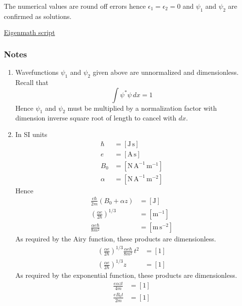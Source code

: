 The numerical values are round off errors
hence $\epsilon_1=\epsilon_2=0$ and $\psi_1$ and $\psi_2$ are confirmed as solutions.

\bigskip
\href{https://georgeweigt.github.io/examples/stern-gerlach-2-demo.html}{Eigenmath script}

\subsubsection*{Notes}

\begin{enumerate}

\item
Wavefunctions $\psi_1$ and $\psi_2$ given above are unnormalized and dimensionless.
Recall that
\begin{equation*}
\int\psi^*\psi\,dx=1
\end{equation*}
%
Hence $\psi_1$ and $\psi_2$ must be multiplied by a normalization factor with
dimension inverse square root of length to cancel with $dx$.

\item
In SI units
\begin{align*}
\hbar&=[\text{J}\,\text{s}]
\\
e&=[\text{A}\,\text{s}]
\\
B_0&=[\text{N}\,\text{A}^{-1}\,\text{m}^{-1}]
\\
\alpha&=[\text{N}\,\text{A}^{-1}\,\text{m}^{-2}]
\end{align*}
%
Hence
\begin{align*}
\frac{e\hbar}{2m}(B_0+\alpha z)&=[\text{J}]
\\[1ex]
\left(\frac{\alpha e}{2\hbar}\right)^{1/3}&=[\text{m}^{-1}]
\\[1ex]
\frac{\alpha e\hbar}{8m^2}&=[\text{m}\,\text{s}^{-2}]
\end{align*}
%
As required by the Airy function, these products are dimensionless.
\begin{align*}
\left(\frac{\alpha e}{2\hbar}\right)^{1/3}
\frac{\alpha e\hbar}{8m^2}\,t^2&=[1]
\\[1ex]
\left(\frac{\alpha e}{2\hbar}\right)^{1/3}z&=[1]
\end{align*}
%
As required by the exponential function, these products are dimensionless.
\begin{align*}
\frac{e\alpha zt}{4m}&=[1]
\\[1ex]
\frac{eB_0t}{2m}&=[1]
\end{align*}

\end{enumerate}


